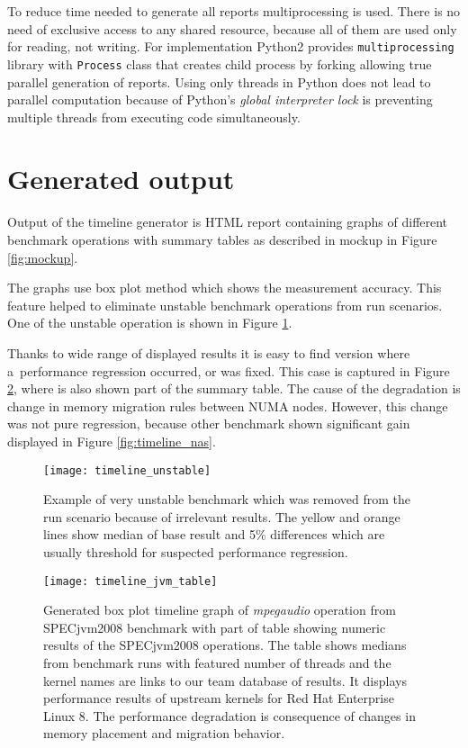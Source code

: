 To reduce time needed to generate all reports multiprocessing is used. There is
no need of exclusive access to any shared resource, because all of them are
used only for reading, not writing. For implementation Python2 provides
\texttt{multiprocessing} library with \texttt{Process} class that creates child
process by forking allowing true parallel generation of reports. Using only
threads in Python does not lead to parallel computation because of Python's
\emph{global interpreter lock} is preventing multiple threads from executing
code simultaneously.

\section{Generated output}
Output of the timeline generator is HTML report containing graphs of different
benchmark operations with summary tables as described in mockup in Figure
\ref{fig:mockup}.

The graphs use box plot method which shows the measurement accuracy. This
feature helped to eliminate unstable benchmark operations from run scenarios.
One of the unstable operation is shown in Figure \ref{fig:timeline_unstable}.

Thanks to wide range of displayed results it is easy to find version where
a~performance regression occurred, or was fixed. This case is captured in Figure
\ref{fig:timeline_jvm_table}, where is also shown part of the summary table. The
cause of the degradation is change in memory migration rules between NUMA nodes.
However, this change was not pure regression, because other benchmark shown
significant gain displayed in Figure \ref{fig:timeline_nas}. 

\begin{figure}
  \centering
  \texttt{[image: timeline\_unstable]}
  \caption{Example of very unstable benchmark which was removed from the run
    scenario because of irrelevant results. The yellow and orange lines show
    median of base result and 5\% differences which are usually threshold for
    suspected performance regression.}
  \label{fig:timeline_unstable}
\end{figure}

\begin{figure}
  \centering
  \texttt{[image: timeline\_jvm\_table]}
  \caption{Generated box plot timeline graph of \emph{mpegaudio} operation from
    SPECjvm2008 benchmark with part of table showing numeric results of the
    SPECjvm2008 operations. The table shows medians from benchmark runs with
    featured number of threads and the kernel names are links to our team
    database of results. It displays performance results of upstream kernels for
    Red Hat Enterprise Linux 8. The performance degradation is consequence of
    changes in memory placement and migration behavior.}
  \label{fig:timeline_jvm_table}
\end{figure}

